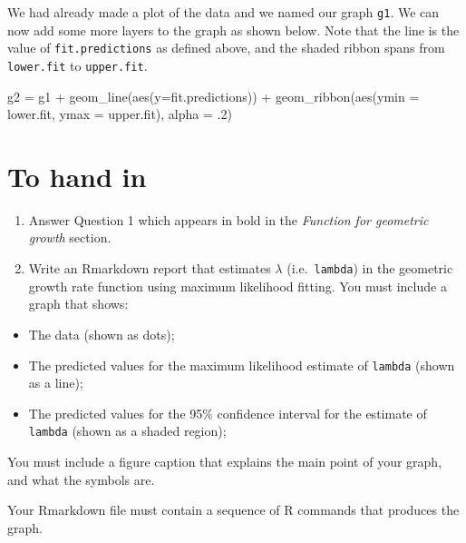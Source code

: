 \documentclass[
]{book}
\newenvironment{Shaded}{\begin{snugshade}}{\end{snugshade}}
\newcommand{\AttributeTok}[1]{\textcolor[rgb]{0.77,0.63,0.00}{#1}}
\newcommand{\DecValTok}[1]{\textcolor[rgb]{0.00,0.00,0.81}{#1}}
\newcommand{\FunctionTok}[1]{\textcolor[rgb]{0.00,0.00,0.00}{#1}}
\newcommand{\NormalTok}[1]{#1}
\newcommand{\OtherTok}[1]{\textcolor[rgb]{0.56,0.35,0.01}{#1}}
\newcommand{\SpecialCharTok}[1]{\textcolor[rgb]{0.00,0.00,0.00}{#1}}
\providecommand{\tightlist}{%
  \setlength{\itemsep}{0pt}\setlength{\parskip}{0pt}}
\begin{document}
We had already made a plot of the data and we named our graph \texttt{g1}. We can now add some more layers to the graph as shown below. Note that the line is the value of \texttt{fit.predictions} as defined above, and the shaded ribbon spans from \texttt{lower.fit} to \texttt{upper.fit}.

\begin{Shaded}
\begin{Highlighting}[]
\NormalTok{g2 }\OtherTok{=}\NormalTok{ g1 }\SpecialCharTok{+}
  \FunctionTok{geom\_line}\NormalTok{(}\FunctionTok{aes}\NormalTok{(}\AttributeTok{y=}\NormalTok{fit.predictions)) }\SpecialCharTok{+}
  \FunctionTok{geom\_ribbon}\NormalTok{(}\FunctionTok{aes}\NormalTok{(}\AttributeTok{ymin =}\NormalTok{ lower.fit, }\AttributeTok{ymax =}\NormalTok{ upper.fit), }\AttributeTok{alpha =}\NormalTok{ .}\DecValTok{2}\NormalTok{)}
\end{Highlighting}
\end{Shaded}

\hypertarget{to-hand-in}{%
\section{To hand in}\label{to-hand-in}}

\begin{enumerate}
\def\labelenumi{\arabic{enumi}.}
\item
  Answer Question 1 which appears in bold in the \emph{Function for geometric growth} section.
\item
  Write an Rmarkdown report that estimates \(\lambda\) (i.e.~\texttt{lambda}) in the geometric growth rate function using maximum likelihood fitting.
  You must include a graph that shows:
\end{enumerate}

\begin{itemize}
\tightlist
\item
  The data (shown as dots);
\item
  The predicted values for the maximum likelihood estimate of \texttt{lambda} (shown as a line);
\item
  The predicted values for the 95\% confidence interval for the estimate of \texttt{lambda} (shown as a shaded region);
\end{itemize}

You must include a figure caption that explains the main point of your graph, and what the symbols are.

Your Rmarkdown file must contain a sequence of R commands that produces the graph.
\end{document}
